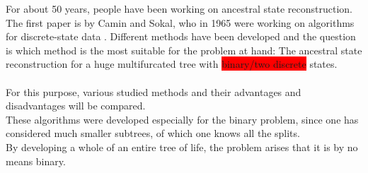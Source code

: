   For about 50 years, people have been working on ancestral state reconstruction. The first paper 
    is by Camin and Sokal, who in 1965 were working on algorithms for discrete-state data 
    \cite{Camin1965}. Different methods have been developed and the question is which method is the 
    most suitable for the problem at hand: The ancestral state reconstruction for a huge 
    multifurcated tree with \colorbox{red}{binary/two discrete} states. \\
   \\
  
  

  For this purpose, various studied methods and their advantages and disadvantages will be compared. \\
  These algorithms were developed especially for the binary problem, since one has considered much 
    smaller subtrees, of which one knows all the splits. \\
  By developing a whole of an entire tree of life, the problem arises that it is by no means binary. \\


